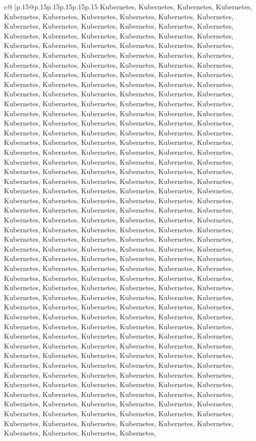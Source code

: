 \documentclass{article}
\begin{document}
{\begin{supertabular}{c@{$\;$}|p{.15\linewidth}@{}p{.15\linewidth}p{.15\linewidth}p{.15\linewidth}p{.15\linewidth}p{.15\linewidth}}
{{{Kubernetes, Kubernetes, Kubernetes, Kubernetes, Kubernetes, Kubernetes, Kubernetes, Kubernetes, Kubernetes, Kubernetes, Kubernetes, Kubernetes, Kubernetes, Kubernetes, Kubernetes, Kubernetes, Kubernetes, Kubernetes, Kubernetes, Kubernetes, Kubernetes, Kubernetes, Kubernetes, Kubernetes, Kubernetes, Kubernetes, Kubernetes, Kubernetes, Kubernetes, Kubernetes, Kubernetes, Kubernetes, Kubernetes, Kubernetes, Kubernetes, Kubernetes, Kubernetes, Kubernetes, Kubernetes, Kubernetes, Kubernetes, Kubernetes, Kubernetes, Kubernetes, Kubernetes, Kubernetes, Kubernetes, Kubernetes, Kubernetes, Kubernetes, Kubernetes, Kubernetes, Kubernetes, Kubernetes, Kubernetes, Kubernetes, Kubernetes, Kubernetes, Kubernetes, Kubernetes, Kubernetes, Kubernetes, Kubernetes, Kubernetes, Kubernetes, Kubernetes, Kubernetes, Kubernetes, Kubernetes, Kubernetes, Kubernetes, Kubernetes, Kubernetes, Kubernetes, Kubernetes, Kubernetes, Kubernetes, Kubernetes, Kubernetes, Kubernetes, Kubernetes, Kubernetes, Kubernetes, Kubernetes, Kubernetes, Kubernetes, Kubernetes, Kubernetes, Kubernetes, Kubernetes, Kubernetes, Kubernetes, Kubernetes, Kubernetes, Kubernetes, Kubernetes, Kubernetes, Kubernetes, Kubernetes, Kubernetes, Kubernetes, Kubernetes, Kubernetes, Kubernetes, Kubernetes, Kubernetes, Kubernetes, Kubernetes, Kubernetes, Kubernetes, Kubernetes, Kubernetes, Kubernetes, Kubernetes, Kubernetes, Kubernetes, Kubernetes, Kubernetes, Kubernetes, Kubernetes, Kubernetes, Kubernetes, Kubernetes, Kubernetes, Kubernetes, Kubernetes, Kubernetes, Kubernetes, Kubernetes, Kubernetes, Kubernetes, Kubernetes, Kubernetes, Kubernetes, Kubernetes, Kubernetes, Kubernetes, Kubernetes, Kubernetes, Kubernetes, Kubernetes, Kubernetes, Kubernetes, Kubernetes, Kubernetes, Kubernetes, Kubernetes, Kubernetes, Kubernetes, Kubernetes, Kubernetes, Kubernetes, Kubernetes, Kubernetes, Kubernetes, Kubernetes, Kubernetes, Kubernetes, Kubernetes, Kubernetes, Kubernetes, Kubernetes, Kubernetes, Kubernetes, Kubernetes, Kubernetes, Kubernetes, Kubernetes, Kubernetes, Kubernetes, Kubernetes, Kubernetes, Kubernetes, Kubernetes, Kubernetes, Kubernetes, Kubernetes, Kubernetes, Kubernetes, Kubernetes, Kubernetes, Kubernetes, Kubernetes, Kubernetes, Kubernetes, Kubernetes, Kubernetes, Kubernetes, Kubernetes, Kubernetes, Kubernetes, Kubernetes, Kubernetes, Kubernetes, Kubernetes, Kubernetes, Kubernetes, Kubernetes, Kubernetes, Kubernetes, Kubernetes, Kubernetes, Kubernetes, Kubernetes, Kubernetes, Kubernetes, Kubernetes, Kubernetes, Kubernetes, Kubernetes, Kubernetes, Kubernetes, Kubernetes, Kubernetes, Kubernetes, Kubernetes, Kubernetes, Kubernetes, Kubernetes, Kubernetes, Kubernetes, Kubernetes, Kubernetes, Kubernetes, Kubernetes, Kubernetes, Kubernetes, Kubernetes, Kubernetes, Kubernetes, Kubernetes, Kubernetes, Kubernetes, Kubernetes, Kubernetes, Kubernetes, Kubernetes, Kubernetes, Kubernetes, Kubernetes, Kubernetes, Kubernetes, Kubernetes, Kubernetes, Kubernetes, Kubernetes, Kubernetes, Kubernetes, Kubernetes, Kubernetes, Kubernetes, Kubernetes, Kubernetes, Kubernetes, Kubernetes, Kubernetes, Kubernetes, Kubernetes, Kubernetes, Kubernetes, Kubernetes, Kubernetes, Kubernetes, Kubernetes, Kubernetes, Kubernetes, }}}
\end{supertabular}}
\end{document}

